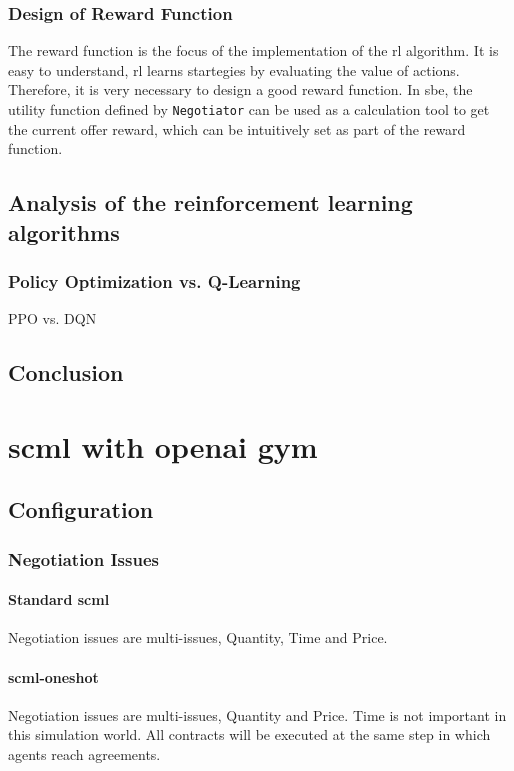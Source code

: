 \subsubsection{Design of Reward Function}
The reward function is the focus of the implementation of the \gls{rl} algorithm. It is easy to understand, \gls{rl} learns startegies by evaluating the value of actions. Therefore, it is very necessary to design a good reward function. In \gls{sbe}, the utility function defined by \texttt{Negotiator} can be used as a calculation tool to get the current offer reward, which can be intuitively set as part of the reward function.  

\subsection{Analysis of the reinforcement learning algorithms}
\subsubsection{Policy Optimization vs. Q-Learning}
PPO vs. DQN

\subsection{Conclusion}


\section{\gls{scml} with \gls{openai gym}}
\subsection{Configuration}
\subsubsection{Negotiation Issues}
\paragraph{Standard \gls{scml}} Negotiation issues are multi-issues, Quantity, Time and Price. 
\paragraph{\gls{scml-oneshot}} Negotiation issues are multi-issues, Quantity and Price. Time is not important in this simulation world. All contracts will be executed at the same step in which agents reach agreements.

